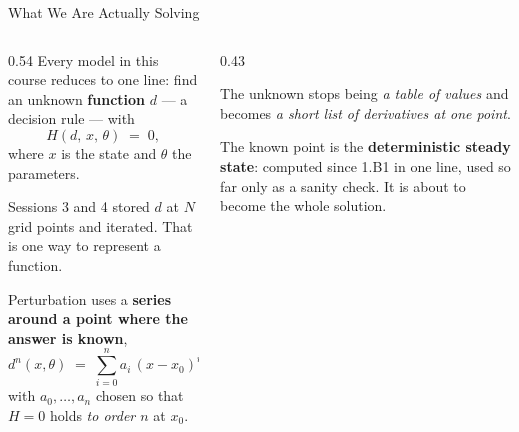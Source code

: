 \begin{frame}{What We Are Actually Solving}
\begin{columns}[T]
\begin{column}{0.54\textwidth}
\small
Every model in this course reduces to one line: find an unknown \textbf{function} $d$ --- a decision rule --- with
\[
  H(d,\,x,\,\theta) \;=\; 0 ,
\]
where $x$ is the state and $\theta$ the parameters.

Sessions 3 and 4 stored $d$ at $N$ grid points and iterated. That is one way to represent a function.

Perturbation uses a \textbf{series around a point where the answer is known},
\[
  d^{n}(x,\theta)\;=\;\sum_{i=0}^{n} a_i\,(x-x_0)^{i},
\]
with $a_0,\dots,a_n$ chosen so that $H=0$ holds \emph{to order $n$} at $x_0$.
\end{column}
\begin{column}{0.43\textwidth}
\begin{conceptbox}[title=\textbf{The shift}]\small
The unknown stops being \emph{a table of values} and becomes \emph{a short list of derivatives at one point}.
\end{conceptbox}
\medskip
\begin{examplebox}\footnotesize
The known point is the \textbf{deterministic steady state}: computed since 1.B1 in one line, used so far only as a sanity check. It is about to become the whole solution.
\end{examplebox}
\end{column}
\end{columns}
\vspace{1mm}
\end{frame}

